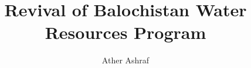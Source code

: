 \documentclass[11pt,a4paper]{article}
\title{Revival of Balochistan Water Resources Program }
\author{Ather Ashraf}
\begin{document}
    \begin{titlingpage}
        \maketitle
    \end{titlingpage}
    
    
\end{document}
